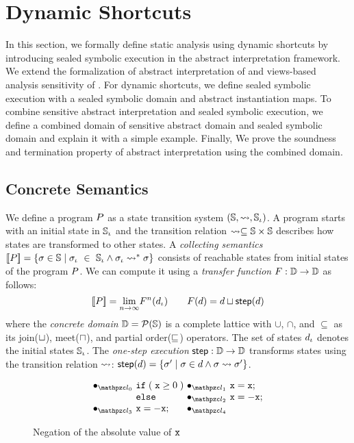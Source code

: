 \section{Dynamic Shortcuts}\label{sec:formal}
In this section, we formally define static analysis using dynamic shortcuts by
introducing sealed symbolic execution in the abstract interpretation framework.
We extend the formalization of abstract interpretation of \citet{abs-interp-1977,
abs-interp-1992} and views-based analysis sensitivity of \citet{sens-toplas}.
For dynamic shortcuts, we define sealed symbolic execution with a
sealed symbolic domain and abstract instantiation maps.  To combine
sensitive abstract interpretation and sealed symbolic execution, we define
a combined domain of sensitive abstract domain and sealed symbolic domain and
explain it with a simple example. Finally, We prove the soundness and
termination property of abstract interpretation using the combined domain.


\subsection{Concrete Semantics}

We define a program $P$ as a state transition system $(\mathbb{S}, \leadsto,
\mathbb{S}_\iota)$.  A program starts with an initial state in $\mathbb{S}_\iota$ and the
transition relation $\leadsto \subseteq \mathbb{S} \times \mathbb{S}$ describes how states
are transformed to other states.  A \textit{collecting semantics} $[\![{P}]\!] =
\{ \sigma \in \mathbb{S} \mid \sigma_\iota~\in~\mathbb{S}_\iota \wedge \sigma_\iota \leadsto^* \sigma \}$ consists of
reachable states from initial states of the program $P$.  We can compute
it using a \textit{transfer function} $F: \mathbb{D} \rightarrow \mathbb{D}$ as
follows:
\[
  [\![{P}]\!] = \underset{n \rightarrow \infty}{\lim}{F^n(d_\iota)}\\
  \qquad
  F(d) = d \sqcup \textsf{step}(d)\\
\]
where the \textit{concrete domain} $\mathbb{D} = \mathcal{P}(\mathbb{S})$ is a complete lattice
with $\cup$, $\cap$, and $\subseteq$ as its join($\sqcup$), meet($\sqcap$), and
partial order($\sqsubseteq$) operators.  The set of states $d_\iota$ denotes the
initial states $\mathbb{S}_\iota$.  The \textit{one-step execution} $\textsf{step}: \mathbb{D}
\rightarrow \mathbb{D}$ transforms states using the transition relation $\leadsto$:
$\textsf{step}(d) = \{ \sigma' \mid \sigma \in d \wedge \sigma \leadsto \sigma' \}$.

\begin{figure}[t]
  \[
    \begin{array}{r@{~}l@{~}c@{~}l}
      \labdot{0} & \kwif \; (\; \varx \geq 0 \;) & \labdot{1} & \varx = \varx ;\\
                 & \kwelse & \labdot{2} & \varx = -\varx ;\\
      \labdot{3} & \varx = -\varx ; & \labdot{4} \\
    \end{array}
  \]
  \vspace*{-1em}
  \caption{Negation of the absolute value of $\texttt{x}$}
  \label{fig:running-example}
\end{figure}

